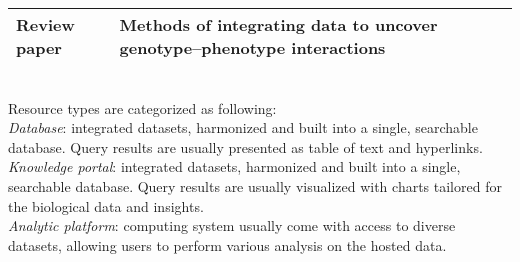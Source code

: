 \documentclass[12pt,letter]{article}
\begin{document}
\begin{landscape}
\begin{table}[]
\begin{tabular}{lp{8cm}ll}
			Review paper       & \multicolumn{2}{l|}{Methods of integrating data to uncover genotype–phenotype interactions} & \cite{Ritchie:2015:Methods}           \\ \hline
		\end{tabular}	\\ \newline
	\footnotesize{Resource types are categorized as following:\\
\textit{Database}: integrated datasets, harmonized and built into a single, searchable database. Query results are usually presented as table of text and hyperlinks.
\\
\textit{Knowledge portal}: integrated datasets, harmonized and built into a single, searchable database. Query results are usually visualized with charts tailored for the biological data and insights.
\\
\textit{Analytic platform}: computing system usually come with access to diverse datasets, allowing users to perform various analysis on the hosted data.	
}
	\end{table}
\end{landscape}



\end{document}
